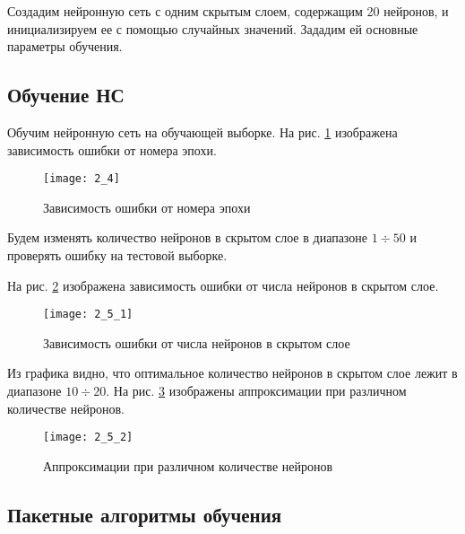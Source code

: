 Создадим нейронную сеть с одним скрытым слоем, содержащим 20 нейронов, и инициализируем ее с помощью случайных значений. Зададим ей основные параметры обучения.



\subsection{Обучение НС}

Обучим нейронную сеть на обучающей выборке. На рис. \ref{fig:2_4} изображена зависимость ошибки от номера эпохи.
\begin{figure}[H]
\begin{center}
	\texttt{[image: 2\_4]}
	\caption{Зависимость ошибки от номера эпохи}
	\label{fig:2_4}
\end{center}
\end{figure}

Будем изменять количество нейронов в скрытом слое в диапазоне $1 \div 50$ и проверять ошибку на тестовой выборке. 

%

На рис. \ref{fig:2_5_1} изображена зависимость ошибки от числа нейронов в скрытом слое.
\begin{figure}[H]
\begin{center}
	\texttt{[image: 2\_5\_1]}
	\caption{Зависимость ошибки от числа нейронов в скрытом слое}
	\label{fig:2_5_1}
\end{center}
\end{figure}
\vspace{-0.5cm}

Из графика видно, что оптимальное количество нейронов в скрытом слое лежит в диапазоне $10 \div 20$. На рис. \ref{fig:2_5_2} изображены аппроксимации при различном количестве нейронов.
\vspace{-0.5cm}
\begin{figure}[H]
\begin{center}
	\texttt{[image: 2\_5\_2]}
	\caption{Аппроксимации при различном количестве нейронов}
	\label{fig:2_5_2}
\end{center}
\end{figure}

\subsection{Пакетные алгоритмы обучения}

